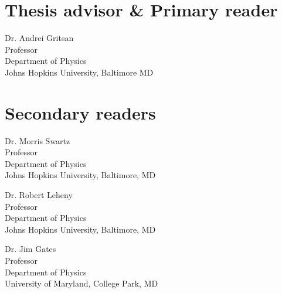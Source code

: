 

\lipsum[1-2]




\begin{singlespace}

    \section*{Thesis advisor \& Primary reader}
    
    Dr. Andrei Gritsan \\
    Professor\\
    Department of Physics\\
    Johns Hopkins University, Baltimore MD 

    \section*{Secondary readers}
    
    Dr. Morris Swartz\\
    Professor\\
    Department of Physics \\
    Johns Hopkins University, Baltimore, MD 
    
    \vspace{0.1in}
    
    Dr. Robert Leheny \\
    Professor\\
    Department of Physics \\
    Johns Hopkins University, Baltimore, MD 
    
    \vspace{0.1in}
    
    Dr. Jim Gates \\
    Professor\\
    Department of Physics \\
    University of Maryland, College Park, MD
    
    



\end{singlespace}